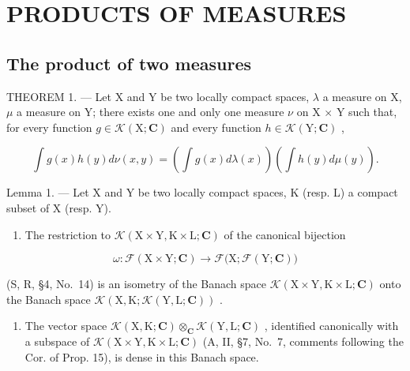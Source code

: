 \section{PRODUCTS OF MEASURES}

\subsection{The product of two measures}

THEOREM 1. --- Let X and Y be two locally compact spaces, \(\lambda\) a measure on X, \(\mu\) a measure on Y; there exists one and only one measure \(\nu\) on X \(\times\) Y such that, for every function \(g \in \mathcal{K}(\mathrm{X};\mathbf{C})\) and every function \(h \in \mathcal{K}(\mathrm{Y};\mathbf{C})\) ,

\[
\int g (x) h (y) d \nu (x, y) = \left(\int g (x) d \lambda (x)\right) \left(\int h (y) d \mu (y)\right).\tag{1}
\]

Lemma 1. --- Let X and Y be two locally compact spaces, K (resp. L) a compact subset of X (resp. Y).

\begin{enumerate}
\def\labelenumi{(\roman{enumi})}
\tightlist
\item
  The restriction to \(\mathcal{K}(\mathrm{X}\times \mathrm{Y},\mathrm{K}\times \mathrm{L};\mathbf{C})\) of the canonical bijection
\end{enumerate}

\[
\omega : \mathcal {F} (\mathrm{X} \times \mathrm{Y}; \mathbf {C}) \rightarrow \mathcal {F} \bigl (\mathrm{X}; \mathcal {F} (\mathrm{Y}; \mathbf {C}) \bigr)
\]

(S, R, §4, No.~14) is an isometry of the Banach space \(\mathcal{K}(\mathrm{X}\times\mathrm{Y},\mathrm{K}\times\mathrm{L};\mathbf{C})\) onto the Banach space \(\mathcal{K}(\mathrm{X},\mathrm{K};\mathcal{K}(\mathrm{Y},\mathrm{L};\mathbf{C}))\) .

\begin{enumerate}
\def\labelenumi{(\roman{enumi})}
\setcounter{enumi}{1}
\tightlist
\item
  The vector space \(\mathcal{K}(\mathrm{X},\mathrm{K};\mathbf{C})\otimes_{\mathbf{C}}\mathcal{K}(\mathrm{Y},\mathrm{L};\mathbf{C})\) , identified canonically with a subspace of \(\mathcal{K}(\mathrm{X}\times \mathrm{Y},\mathrm{K}\times \mathrm{L};\mathbf{C})\) (A, II, §7, No.~7, comments following the Cor. of Prop. 15), is dense in this Banach space.
\end{enumerate}

